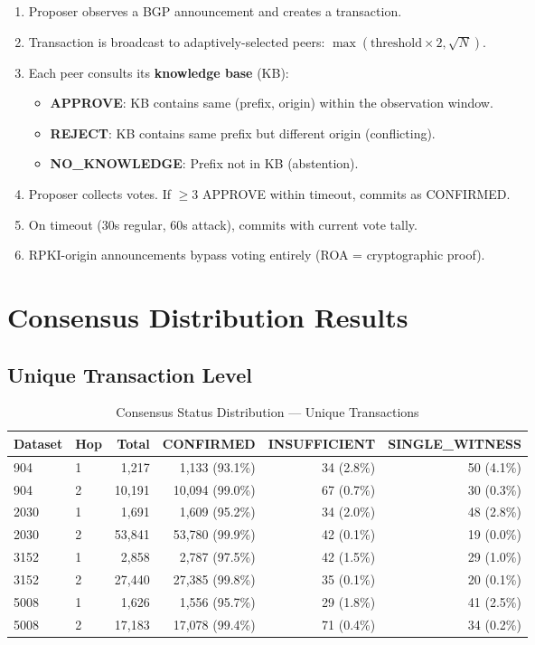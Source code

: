 \documentclass[11pt,a4paper]{article}
\begin{document}
\begin{enumerate}
    \item Proposer observes a BGP announcement and creates a transaction.
    \item Transaction is broadcast to adaptively-selected peers: $\max(\text{threshold} \times 2, \sqrt{N})$.
    \item Each peer consults its \textbf{knowledge base} (KB):
    \begin{itemize}
        \item \textbf{APPROVE}: KB contains same (prefix, origin) within the observation window.
        \item \textbf{REJECT}: KB contains same prefix but different origin (conflicting).
        \item \textbf{NO\_KNOWLEDGE}: Prefix not in KB (abstention).
    \end{itemize}
    \item Proposer collects votes. If $\geq$3 APPROVE within timeout, commits as CONFIRMED.
    \item On timeout (30s regular, 60s attack), commits with current vote tally.
    \item RPKI-origin announcements bypass voting entirely (ROA = cryptographic proof).
\end{enumerate}

\section{Consensus Distribution Results}

\subsection{Unique Transaction Level}

\begin{table}[H]
\centering
\caption{Consensus Status Distribution --- Unique Transactions}
\begin{tabular}{llrrrr}
\toprule
\textbf{Dataset} & \textbf{Hop} & \textbf{Total} & \textbf{CONFIRMED} & \textbf{INSUFFICIENT} & \textbf{SINGLE\_WITNESS} \\
\midrule
904   & 1 & 1,217  & 1,133 (93.1\%) & 34 (2.8\%)  & 50 (4.1\%) \\
904   & 2 & 10,191 & 10,094 (99.0\%) & 67 (0.7\%) & 30 (0.3\%) \\
2030  & 1 & 1,691  & 1,609 (95.2\%) & 34 (2.0\%)  & 48 (2.8\%) \\
2030  & 2 & 53,841 & 53,780 (99.9\%) & 42 (0.1\%) & 19 (0.0\%) \\
3152  & 1 & 2,858  & 2,787 (97.5\%) & 42 (1.5\%)  & 29 (1.0\%) \\
3152  & 2 & 27,440 & 27,385 (99.8\%) & 35 (0.1\%) & 20 (0.1\%) \\
5008  & 1 & 1,626  & 1,556 (95.7\%) & 29 (1.8\%)  & 41 (2.5\%) \\
5008  & 2 & 17,183 & 17,078 (99.4\%) & 71 (0.4\%) & 34 (0.2\%) \\
\bottomrule
\end{tabular}
\end{table}
\end{document}

